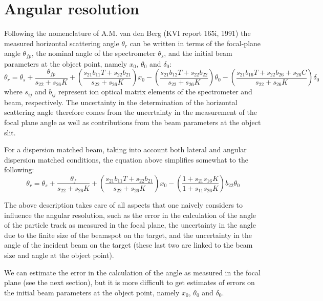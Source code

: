 \documentclass[11pt]{report}
\begin{document}
\section{Angular resolution}

Following the nomenclature of A.M. van den Berg (KVI report 165i, 1991) 
the measured horizontal scattering angle $\theta_r$ can be written in terms of the focal-plane angle
$\theta_{fp}$, the nominal angle of the spectrometer $\theta_s$, and the initial beam 
parameters at the object point, namely $x_0$, $\theta_0$ and $\delta_0$:
\begin{equation} 
	\theta_{r}=  \theta_s + \frac{\theta_{fp}}{s_{22}+s_{26}K}  
	+ (\frac{s_{21}b_{11}T + s_{22}b_{21}}{s_{22}+s_{26}K})x_0
	- (\frac{s_{21}b_{12}T+s_{22}b_{22}}{s_{22}+s_{26}K})\theta_0
	- (\frac{s_{21}b_{16}T+s_{22}b_{26}+s_{26}C}{s_{22}+s_{26}K})\delta_0	
\end{equation} 
\noindent where $s_{ij}$ and $b_{ij}$ represent ion optical matrix elements of the spectrometer and beam, respectively.
The uncertainty in the determination of the horizontal scattering angle therefore  comes from the uncertainty in the measurement
of the focal plane angle as well as contributions from the beam parameters at the object slit.

For a dispersion matched beam, taking into account both lateral and angular dispersion matched conditions, 
the equation above simplifies somewhat to the following:
\begin{equation} 
	\theta_{r}=  \theta_s + \frac{\theta_f}{s_{22}+s_{26}K}  
	+ (\frac{s_{21}b_{11}T + s_{22}b_{21}}{s_{22}+s_{26}K})x_0
	- (\frac{1 + s_{21}s_{16}K}{1+s_{11}s_{26}K})b_{22}\theta_0
\end{equation} 

\noindent The above description takes care of all aspects that one naively considers to influence the angular resolution, such as
the error in the calculation of the angle of the particle track as measured in the focal plane, 
the uncertainty in the angle due to the finite size of the beamspot on the target, and
the uncertainty in the angle of the incident beam on the target (these last two are linked to the beam size and angle at the object point).

We can estimate the error in the calculation of the angle as measured in the focal plane (see the next section), but it is more
difficult to get estimates of errors on the initial beam 
parameters at the object point, namely $x_0$, $\theta_0$ and $\delta_0$. 
\end{document}
